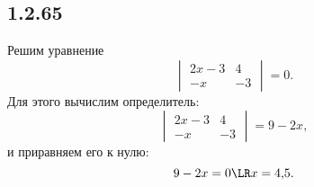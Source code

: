 \subsection{1.2.65}

Решим уравнение
\[
\begin{vmatrix}
	2x-3 & 4 \\
	-x & -3
\end{vmatrix}
=0.
\]
Для этого вычислим определитель:
\[
\begin{vmatrix}
	2x-3 & 4 \\
	-x & -3
\end{vmatrix}
=9-2x,
\]
и приравняем его к нулю:
\[
9-2x=0\LR x=4{,}5.
\]